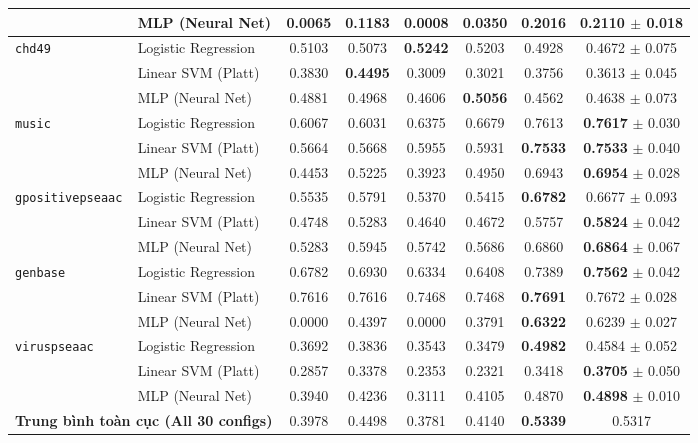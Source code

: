 \documentclass[10pt,a4paper,twoside]{article}
\begin{document}
\begin{table}[H]
{\begin{tabular}{llcccccc}
 & MLP (Neural Net) & 0.0065 & 0.1183 & 0.0008 & 0.0350 & 0.2016 & \textbf{0.2110} $\pm$ 0.018 \\
\midrule
\multirow{3}{*}{\texttt{chd49}} & Logistic Regression & 0.5103 & 0.5073 & \textbf{0.5242} & 0.5203 & 0.4928 & 0.4672 $\pm$ 0.075 \\
 & Linear SVM (Platt) & 0.3830 & \textbf{0.4495} & 0.3009 & 0.3021 & 0.3756 & 0.3613 $\pm$ 0.045 \\
 & MLP (Neural Net) & 0.4881 & 0.4968 & 0.4606 & \textbf{0.5056} & 0.4562 & 0.4638 $\pm$ 0.073 \\
\midrule
\multirow{3}{*}{\texttt{music}} & Logistic Regression & 0.6067 & 0.6031 & 0.6375 & 0.6679 & 0.7613 & \textbf{0.7617} $\pm$ 0.030 \\
 & Linear SVM (Platt) & 0.5664 & 0.5668 & 0.5955 & 0.5931 & \textbf{0.7533} & \textbf{0.7533} $\pm$ 0.040 \\
 & MLP (Neural Net) & 0.4453 & 0.5225 & 0.3923 & 0.4950 & 0.6943 & \textbf{0.6954} $\pm$ 0.028 \\
\midrule
\multirow{3}{*}{\texttt{gpositivepseaac}} & Logistic Regression & 0.5535 & 0.5791 & 0.5370 & 0.5415 & \textbf{0.6782} & 0.6677 $\pm$ 0.093 \\
 & Linear SVM (Platt) & 0.4748 & 0.5283 & 0.4640 & 0.4672 & 0.5757 & \textbf{0.5824} $\pm$ 0.042 \\
 & MLP (Neural Net) & 0.5283 & 0.5945 & 0.5742 & 0.5686 & 0.6860 & \textbf{0.6864} $\pm$ 0.067 \\
\midrule
\multirow{3}{*}{\texttt{genbase}} & Logistic Regression & 0.6782 & 0.6930 & 0.6334 & 0.6408 & 0.7389 & \textbf{0.7562} $\pm$ 0.042 \\
 & Linear SVM (Platt) & 0.7616 & 0.7616 & 0.7468 & 0.7468 & \textbf{0.7691} & 0.7672 $\pm$ 0.028 \\
 & MLP (Neural Net) & 0.0000 & 0.4397 & 0.0000 & 0.3791 & \textbf{0.6322} & 0.6239 $\pm$ 0.027 \\
\midrule
\multirow{3}{*}{\texttt{viruspseaac}} & Logistic Regression & 0.3692 & 0.3836 & 0.3543 & 0.3479 & \textbf{0.4982} & 0.4584 $\pm$ 0.052 \\
 & Linear SVM (Platt) & 0.2857 & 0.3378 & 0.2353 & 0.2321 & 0.3418 & \textbf{0.3705} $\pm$ 0.050 \\
 & MLP (Neural Net) & 0.3940 & 0.4236 & 0.3111 & 0.4105 & 0.4870 & \textbf{0.4898} $\pm$ 0.010 \\
\midrule
\multicolumn{2}{l}{\textbf{Trung bình toàn cục (All 30 configs)}} & 0.3978 & 0.4498 & 0.3781 & 0.4140 & \textbf{0.5339} & 0.5317 \\
\bottomrule
\end{tabular}%
}
\end{table}
\clearpage
\end{document}
